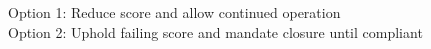 Option 1: Reduce score and allow continued operation \\ Option 2: Uphold failing score and mandate closure until compliant%
